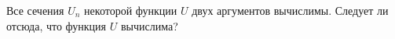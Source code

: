 Все сечения $U_n$ некоторой функции $U$ двух аргументов вычислимы. Следует ли отсюда, что функция $U$ вычислима?